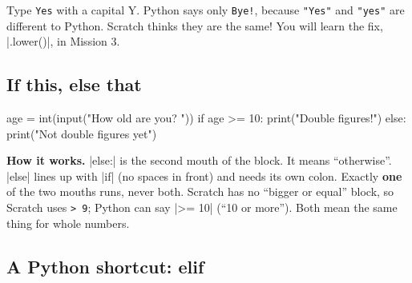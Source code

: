 \begin{watchout}
Type \texttt{Yes} with a capital Y. Python says only \texttt{Bye!}, because \texttt{"Yes"} and \texttt{"yes"} are different to Python. Scratch thinks they are the same! You will learn the fix, \py|.lower()|, in Mission 3.
\end{watchout}

\subsection*{If this, else that}

\begin{tcbraster}[raster columns=2, raster equal height=rows, raster column skip=12pt, raster valign=center, raster force size=false, raster column 1/.style={width=0.36\linewidth}, raster column 2/.style={width=0.64\linewidth-12pt}]
\begin{tcolorbox}[colback=white, colframe=white, boxrule=0pt, valign=center, left=0pt, right=0pt]
\begin{scratch}
\end{scratch}
\end{tcolorbox}
\begin{code}
age = int(input("How old are you? "))
if age >= 10:
    print("Double figures!")
else:
    print("Not double figures yet")
\end{code}
\end{tcbraster}

\textbf{How it works.} \py|else:| is the second mouth of the  block. It means ``otherwise''. \py|else| lines up with \py|if| (no spaces in front) and needs its own colon. Exactly \textbf{one} of the two mouths runs, never both. Scratch has no ``bigger or equal'' block, so Scratch uses \texttt{> 9}; Python can say \py|>= 10| (``10 or more''). Both mean the same thing for whole numbers.

\subsection*{A Python shortcut: elif}

